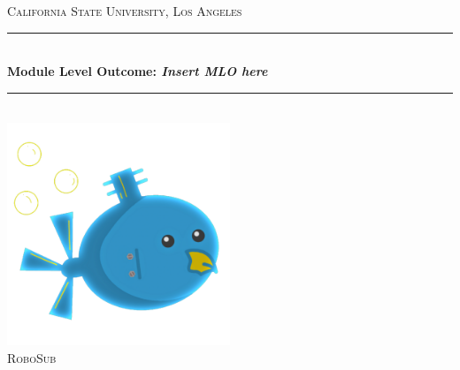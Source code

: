 \begin{titlepage} %

	\newcommand{\HRule}{\rule{\linewidth}{0.5mm}} %

	\center %


	\textsc{\LARGE California State University, Los Angeles}\\[1.5cm] %


	\HRule\\[0.4cm]

    {\huge\bfseries Module Level Outcome: \emph{Insert MLO here}}\\[0.4cm] %

	\HRule\\[1.5cm]


	\vfill\vfill
	\includegraphics[width=0.5\textwidth]{robosub_logo.png}\\[1cm] %


	\textsc{\Large RoboSub}\\[0.5cm] %


\end{titlepage}
